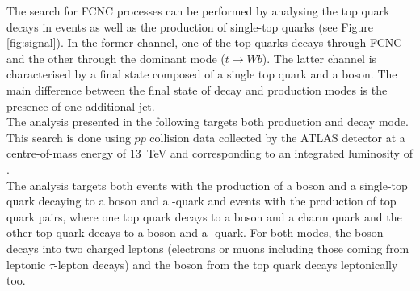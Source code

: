 \noindent The search for FCNC \tZc processes can be performed by analysing the top quark decays in \ttbar events as well as the production of single-top quarks (see Figure \ref{fig:signal}). In the former channel, one of the top quarks decays through FCNC and the other through the dominant mode ($t\to Wb$). The latter channel is characterised by a final state composed of a single top quark and a \PZ boson. The main difference between the final state of decay and production modes is the presence of one additional jet. \\
The analysis presented in the following targets both production and decay mode. This search is done using $pp$ collision data collected by the ATLAS detector at a centre-of-mass energy of \SI{13}{\TeV} and corresponding to an integrated luminosity of \lumi.\\
The analysis targets both events with the production of a \PZ boson and a single-top quark decaying to a \PW boson and a \Pqb-quark and events with the production of top quark pairs, where one top quark decays to a \PZ boson and a charm quark and the other top quark decays to a \PW boson and a \Pqb-quark. For both modes, the \PZ boson decays into two charged leptons (electrons or muons including those coming from leptonic $\tau$-lepton decays) and the \PW boson from the top quark decays leptonically too. \\

